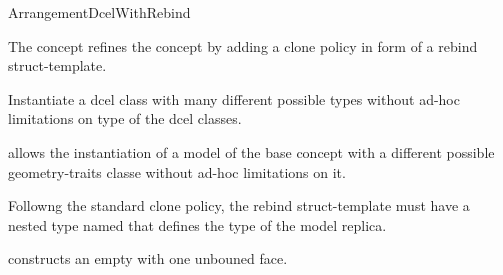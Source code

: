 \ccRefPageBegin

\begin{ccRefConcept}{ArrangementDcelWithRebind}

\ccDefinition

The concept \ccRefName{} refines the  concept by adding
a clone policy in form of a rebind struct-template.

Instantiate a dcel{} class with many different possible types without ad-hoc limitations on type of the dcel classes.

\ccRefines
{}

\ccTypes
   {allows the instantiation of a model of the base concept
    with a different possible geometry-traits
   classe without ad-hoc limitations on it.

   Followng the standard clone policy, the rebind struct-template must
   have a nested type named  that defines the type of the
   model replica.}

\ccCreation
{}
  {constructs an empty \dcel{} with one unbouned face.}

\ccHasModels
  \\
  \\

\end{ccRefConcept}
\ccRefPageEnd
